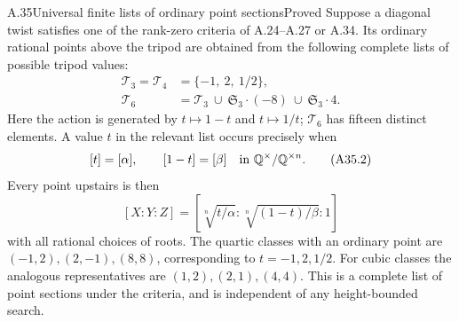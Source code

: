 \begin{statement}{A.35}{Universal finite lists of ordinary point sections}{Proved}
Suppose a diagonal twist satisfies one of the rank-zero criteria of
A.24--A.27 or A.34. Its ordinary rational points above the tripod are
obtained from the following complete lists of possible tripod values:
\[
\begin{aligned}
\mathcal T_3=\mathcal T_4&=\{-1,\ 2,\ 1/2\},\\
\mathcal T_6&=\mathcal T_3\ \cup\ \mathfrak S_3\cdot(-8)
                         \ \cup\ \mathfrak S_3\cdot4.
\end{aligned}
\tag{A35.1}
\]
Here the action is generated by $t\mapsto1-t$ and $t\mapsto1/t$;
$\mathcal T_6$ has fifteen distinct elements. A value $t$ in the
relevant list occurs precisely when
\[
[t]=[\alpha],\qquad[1-t]=[\beta]
          \quad\text{in }\mathbb Q^\times/\mathbb Q^{\times n}.
\tag{A35.2}
\]
Every point upstairs is then
\[
[X:Y:Z]=\left[\sqrt[n]{t/\alpha}:
                       \sqrt[n]{(1-t)/\beta}:1\right]
\tag{A35.3}
\]
with all rational choices of roots. The quartic classes with an ordinary
point are $(-1,2),(2,-1),(8,8)$, corresponding to $t=-1,2,1/2$.
For cubic classes the analogous representatives are $(1,2),(2,1),(4,4)$.
This is a complete list of point sections under the criteria, and is
independent of any height-bounded search.
\end{statement}
